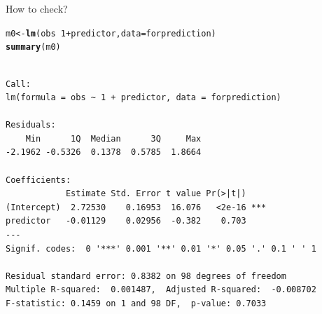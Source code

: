\documentclass[10pt]{beamer}\usepackage[]{graphicx}\usepackage[]{color}
\makeatletter
\newcommand{\hlnum}[1]{\textcolor[rgb]{0.686,0.059,0.569}{#1}}%
\newcommand{\hlopt}[1]{\textcolor[rgb]{0,0,0}{#1}}%
\newcommand{\hlstd}[1]{\textcolor[rgb]{0.345,0.345,0.345}{#1}}%
\newcommand{\hlkwb}[1]{\textcolor[rgb]{0.69,0.353,0.396}{#1}}%
\newcommand{\hlkwc}[1]{\textcolor[rgb]{0.333,0.667,0.333}{#1}}%
\newcommand{\hlkwd}[1]{\textcolor[rgb]{0.737,0.353,0.396}{\textbf{#1}}}%
\newenvironment{kframe}{%
 \def\at@end@of@kframe{}%
 \ifinner\ifhmode%
  \def\at@end@of@kframe{\end{minipage}}%
  \begin{minipage}{\columnwidth}%
 \fi\fi%
 \def\FrameCommand##1{\hskip\@totalleftmargin \hskip-\fboxsep
 \colorbox{shadecolor}{##1}\hskip-\fboxsep
     \hskip-\linewidth \hskip-\@totalleftmargin \hskip\columnwidth}%
 \MakeFramed {\advance\hsize-\width
   \@totalleftmargin\z@ \linewidth\hsize
   \@setminipage}}%
 {\par\unskip\endMakeFramed%
 \at@end@of@kframe}
\newenvironment{knitrout}{}{} %
\makeatother
\begin{document}
\begin{frame}[fragile]{How to check?}
\begin{knitrout}
\color{fgcolor}\begin{kframe}
\begin{alltt}
\hlstd{m0} \hlkwb{<-} \hlkwd{lm}\hlstd{(obs} \hlopt{~} \hlnum{1} \hlopt{+} \hlstd{predictor,} \hlkwc{data}\hlstd{=forprediction)}
\hlkwd{summary}\hlstd{(m0)}
\end{alltt}
\begin{verbatim}

Call:
lm(formula = obs ~ 1 + predictor, data = forprediction)

Residuals:
    Min      1Q  Median      3Q     Max 
-2.1962 -0.5326  0.1378  0.5785  1.8664 

Coefficients:
            Estimate Std. Error t value Pr(>|t|)    
(Intercept)  2.72530    0.16953  16.076   <2e-16 ***
predictor   -0.01129    0.02956  -0.382    0.703    
---
Signif. codes:  0 '***' 0.001 '**' 0.01 '*' 0.05 '.' 0.1 ' ' 1

Residual standard error: 0.8382 on 98 degrees of freedom
Multiple R-squared:  0.001487,	Adjusted R-squared:  -0.008702 
F-statistic: 0.1459 on 1 and 98 DF,  p-value: 0.7033
\end{verbatim}
\end{kframe}
\end{knitrout}
\end{frame}
\end{document}
